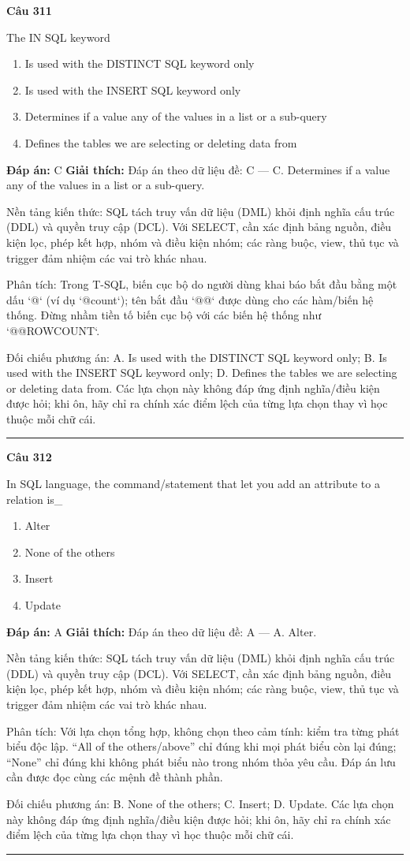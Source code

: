 \documentclass[11pt,a4paper]{article}
\newenvironment{question}[1]{%
  \par\vspace{1em}\noindent\textbf{\large Câu #1}\par\vspace{0.4em}
}{%
  \par\vspace{1em}\hrule\vspace{0.6em}
}
\newenvironment{choices}{%
  \begin{enumerate}[label=\textbf{\Alph*.},leftmargin=2.2em,itemsep=2pt,topsep=3pt]
}{%
  \end{enumerate}
}
\newcommand{\choice}{\item}
\begin{document}
\begin{question}{311}
The IN SQL keyword
\begin{choices}
\choice Is used with the DISTINCT SQL keyword only
\choice Is used with the INSERT SQL keyword only
\choice Determines if a value
any of the values in a list or a sub-query
\choice Defines the tables we are selecting or deleting data from
\end{choices}
\textbf{Đáp án:} C
\textbf{Giải thích:} Đáp án theo dữ liệu đề: C — C. Determines if a value any of the values in a list or a sub-query.

Nền tảng kiến thức: SQL tách truy vấn dữ liệu (DML) khỏi định nghĩa cấu trúc (DDL) và quyền truy cập (DCL). Với SELECT, cần xác định bảng nguồn, điều kiện lọc, phép kết hợp, nhóm và điều kiện nhóm; các ràng buộc, view, thủ tục và trigger đảm nhiệm các vai trò khác nhau.

Phân tích: Trong T-SQL, biến cục bộ do người dùng khai báo bắt đầu bằng một dấu `@` (ví dụ `@count`); tên bắt đầu `@@` được dùng cho các hàm/biến hệ thống. Đừng nhầm tiền tố biến cục bộ với các biến hệ thống như `@@ROWCOUNT`.

Đối chiếu phương án: A. Is used with the DISTINCT SQL keyword only; B. Is used with the INSERT SQL keyword only; D. Defines the tables we are selecting or deleting data from. Các lựa chọn này không đáp ứng định nghĩa/điều kiện được hỏi; khi ôn, hãy chỉ ra chính xác điểm lệch của từng lựa chọn thay vì học thuộc mỗi chữ cái.
\end{question}


\begin{question}{312}
In SQL language, the command/statement that let you add an attribute to a relation is_
\begin{choices}
\choice Alter
\choice None of the others
\choice Insert
\choice Update
\end{choices}
\textbf{Đáp án:} A
\textbf{Giải thích:} Đáp án theo dữ liệu đề: A — A. Alter.

Nền tảng kiến thức: SQL tách truy vấn dữ liệu (DML) khỏi định nghĩa cấu trúc (DDL) và quyền truy cập (DCL). Với SELECT, cần xác định bảng nguồn, điều kiện lọc, phép kết hợp, nhóm và điều kiện nhóm; các ràng buộc, view, thủ tục và trigger đảm nhiệm các vai trò khác nhau.

Phân tích: Với lựa chọn tổng hợp, không chọn theo cảm tính: kiểm tra từng phát biểu độc lập. “All of the others/above” chỉ đúng khi mọi phát biểu còn lại đúng; “None” chỉ đúng khi không phát biểu nào trong nhóm thỏa yêu cầu. Đáp án lưu cần được đọc cùng các mệnh đề thành phần.

Đối chiếu phương án: B. None of the others; C. Insert; D. Update. Các lựa chọn này không đáp ứng định nghĩa/điều kiện được hỏi; khi ôn, hãy chỉ ra chính xác điểm lệch của từng lựa chọn thay vì học thuộc mỗi chữ cái.
\end{question}
\end{document}
